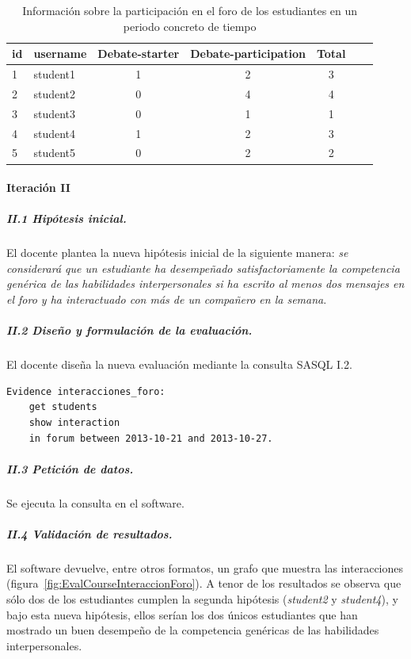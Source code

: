 \begin{table}
	\centering
	\caption{Información sobre la participación en el foro de los estudiantes en un periodo concreto de tiempo}
	\label{tab:EvalCourseEj1}
	\begin{tabular}{|l|l|c|c|c|c|c|}
		\hline
		id & username & Debate-starter & Debate-participation & Total \\
		\hline
		\hline
		1 & student1 & 1 & 2 & 3  \\
		\hline
		2 & student2 & 0 & 4 & 4  \\
		\hline
		3 & student3 & 0 & 1 & 1  \\
		\hline
		4 & student4 & 1 & 2 & 3  \\
		\hline
		5 & student5 & 0 & 2 & 2  \\
		\hline
	\end{tabular}
\end{table}


\paragraph*{Iteración II}

\subparagraph*{II.1 Hipótesis inicial.}

El docente plantea la nueva hipótesis inicial de la siguiente manera: \emph{se considerará que un estudiante ha desempeñado satisfactoriamente la competencia genérica de las habilidades interpersonales si ha escrito al menos dos mensajes en el foro y ha interactuado con más de un compañero en la semana}.

\subparagraph*{II.2 Diseño y formulación de la evaluación.}

El docente diseña la nueva evaluación mediante la consulta SASQL I.2.

\begin{verbatim}
Evidence interacciones_foro: 
	get students
	show interaction
	in forum between 2013-10-21 and 2013-10-27.
\end{verbatim}

\subparagraph*{II.3 Petición de datos.}

Se ejecuta la consulta en el software.

\subparagraph*{II.4 Validación de resultados.}

El software devuelve, entre otros formatos, un grafo que muestra las interacciones (figura~\ref{fig:EvalCourseInteraccionForo}). A tenor de los resultados se observa que sólo dos de los estudiantes cumplen la segunda hipótesis (\emph{student2} y \emph{student4}), y bajo esta nueva hipótesis, ellos serían los dos únicos estudiantes que han mostrado un buen desempeño de la competencia genéricas de las habilidades interpersonales.


